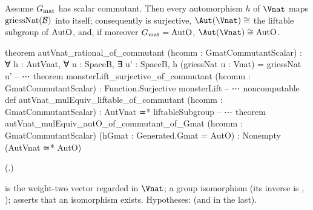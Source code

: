 \begin{theorem}\label{ch22:thm:rationalcomm}
Assume $G_{\mathrm{mat}}$ has scalar commutant.  Then every automorphism $h$ of $\Vnat$ maps
$\mathrm{griessNat}(\mathcal{B})$ into itself; consequently  is surjective, $\Aut(\Vnat)\cong$ the
liftable subgroup of $\mathrm{AutO}$, and, if moreover $G_{\mathrm{mat}}=\mathrm{AutO}$, $\Aut(\Vnat)\cong\chtwentytwoAutO$.
\end{theorem}
\begin{leancode}
theorem autVnat_rational_of_commutant (hcomm : GmatCommutantScalar) :
    ∀ h : AutVnat, ∀ u : SpaceB, ∃ u' : SpaceB, h (griessNat u : Vnat) = griessNat u'
-- ⋯
theorem monsterLift_surjective_of_commutant (hcomm : GmatCommutantScalar) :
    Function.Surjective monsterLift
-- ⋯
noncomputable def autVnat_mulEquiv_liftable_of_commutant (hcomm : GmatCommutantScalar) :
    AutVnat ≃* liftableSubgroup
-- ⋯
theorem autVnat_mulEquiv_autO_of_commutant_of_Gmat (hcomm : GmatCommutantScalar)
    (hGmat : Generated.Gmat = AutO) : Nonempty (AutVnat ≃* AutO)
\end{leancode}
(.)
\begin{dictionary}
 is the weight-two vector regarded in $\Vnat$;  a group
isomorphism (its inverse is , );
 asserts that an isomorphism exists.  Hypotheses:  (and  in the last).
\end{dictionary}
